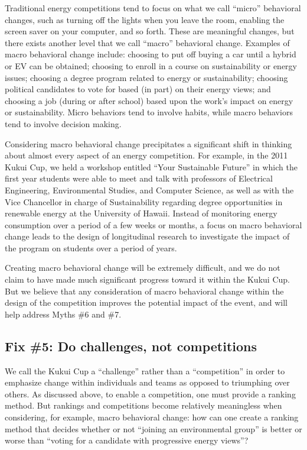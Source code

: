 \documentclass[jou]{apa} %
\begin{document}
Traditional energy competitions tend to focus on what we call ``micro'' behavioral
changes, such as turning off the lights when you leave the room, enabling the screen saver
on your computer, and so forth.  These are meaningful changes, but there exists another
level that we call ``macro'' behavioral change.  Examples of macro behavioral change
include: choosing to put off buying a car until a hybrid or EV can be obtained; choosing
to enroll in a course on sustainability or energy issues; choosing a degree program
related to energy or sustainability; choosing political candidates to vote for based (in
part) on their energy views; and choosing a job (during or after school) based upon the
work's impact on energy or sustainability.  Micro behaviors tend to involve habits, while
macro behaviors tend to involve decision making.

Considering macro behavioral change precipitates a significant shift in thinking about
almost every aspect of an energy competition.  For example, in the 2011 Kukui Cup, we held
a workshop entitled ``Your Sustainable Future'' in which the first year students were able
to meet and talk with professors of Electrical Engineering, Environmental Studies, and
Computer Science, as well as with the Vice Chancellor in charge of Sustainability
regarding degree opportunities in renewable energy at the University of Hawaii.  Instead
of monitoring energy consumption over a period of a few weeks or months, a focus on macro
behavioral change leads to the design of longitudinal research to investigate the impact
of the program on students over a period of years.

Creating macro behavioral change will be extremely difficult, and we do not claim to have
made much significant progress toward it within the Kukui Cup.  But we believe that any
consideration of macro behavioral change within the design of the competition improves the
potential impact of the event, and will help address Myths \#6 and \#7.

\subsection{Fix \#5: Do challenges, not competitions}

We call the Kukui Cup a ``challenge'' rather than a ``competition'' in order to emphasize
change within individuals and teams as opposed to triumphing over others.  As discussed
above, to enable a competition, one must provide a ranking method.  But rankings and
competitions become relatively meaningless when considering, for example, macro behavioral
change: how can one create a ranking method that decides whether or not ``joining an
environmental group'' is better or worse than ``voting for a candidate with progressive
energy views''?
\end{document}
